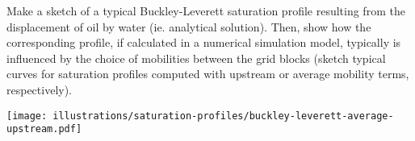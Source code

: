\begin{question}
  Make a sketch of a typical Buckley-Leverett saturation profile resulting from the displacement of oil by water (ie. analytical solution). Then, show how the corresponding profile, if calculated in a numerical simulation model, typically is influenced by the choice of mobilities between the grid blocks (sketch typical curves for saturation profiles computed with upstream or average mobility terms, respectively).
\end{question}

\begin{center}
  \texttt{[image: illustrations/saturation-profiles/buckley-leverett-average-upstream.pdf]}
\end{center}



